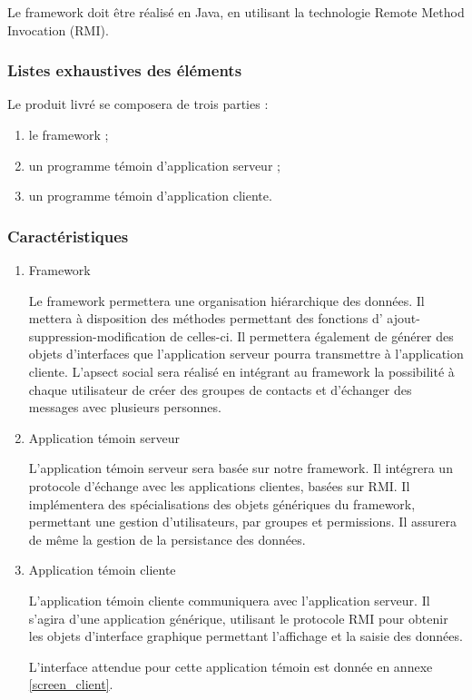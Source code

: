 Le framework doit être réalisé en Java, en utilisant la technologie Remote Method Invocation (RMI).

\subsubsection{Listes exhaustives des éléments} 
Le produit livré se composera de trois parties :
\begin{enumerate}
 \item le framework ;
 \item un programme témoin d'application serveur ;
 \item un programme témoin d'application cliente.
\end{enumerate}

\subsubsection{Caractéristiques}
\begin{enumerate}
 \item Framework

Le framework permettera une organisation hiérarchique des données.
Il mettera à disposition des méthodes permettant des fonctions d' ajout-suppression-modification de celles-ci.
Il permettera également de générer des objets d'interfaces que l'application serveur pourra transmettre à l'application cliente.
L'apsect social sera réalisé en intégrant au framework la possibilité à chaque utilisateur de créer des groupes de contacts et d'échanger des messages avec plusieurs personnes.

 \item Application témoin serveur

L'application témoin serveur sera basée sur notre framework.
Il intégrera un protocole d'échange avec les applications clientes, basées sur RMI.
Il implémentera des spécialisations des objets génériques du framework, permettant une gestion d'utilisateurs, par groupes et permissions.
Il assurera de même la gestion de la persistance des données.

 \item Application témoin cliente

L'application témoin cliente communiquera avec l'application serveur.
Il s'agira d'une application générique, utilisant le protocole RMI pour obtenir les objets d'interface graphique permettant l'affichage et la saisie des données.

L'interface attendue pour cette application témoin est donnée en annexe
\ref{screen_client}.
\end{enumerate}
